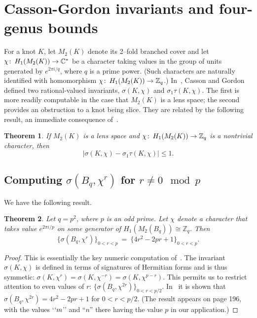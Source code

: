 \documentclass[10pt,oneside]{amsart}
\def\Z{{\mathbb Z}}
\def\C{{\mathbb C}}
\def\co{\colon\thinspace}
\newtheorem{theorem}{Theorem}
\theoremstyle{definition}
\begin{document}
\section{Casson-Gordon invariants and four-genus bounds}\label{sec-cg}
For a knot  $K$, let $M_2(K)$ denote its 2--fold branched cover and let $\chi\co H_1(M_2(K)) \to \C^*$ be a character  taking values in the group of units generated by $e^{2 \pi i/q}$, where $q$ is a prime power.  (Such characters are naturally identified with homomorphism $\chi\co H_1(M_2(K)) \to \Z_q$.)   In~\cite{MR900252}, Casson and Gordon defined two rational-valued  invariants, $\sigma(K,\chi)$ and $\sigma_1 \tau (K,\chi)$.  The first is more readily computable in the case that $M_2(K)$ is a lens space; the second    provides an obstruction to   a knot   being slice.  They are related by the following result, an immediate consequence of~\cite[Theorem 3]{MR900252}.

\begin{theorem}  If $M_2(K)$ is a lens space and $\chi \co H_1(M_2(K)) \to \Z_q$ is a nontrivial character, then   \[ \big|  \sigma(K, \chi)  - \sigma_1 \tau(K, \chi) \big| \le 1.\]
\end{theorem}

\subsection{Computing $\sigma (B_q, \chi^r) $ for $r \ne 0  \mod p$}

We have the following result.
 
\begin{theorem}\label{thm-nonzero}
Let  $q = p^2$, where  $p$ is an odd prime.  Let $\chi$ denote a  character  that takes value  $e^{2 \pi i /p}$ on some generator of $H_1(M_2(B_q)) \cong \Z_q$.   Then
\[ \{\sigma(B_q, \chi^r)\}_{0<r< p}\ =\  \{  4r^2 - 2pr +1 \}_{0<r< p}.\]
\end{theorem}
\begin{proof}  This is essentially the key  numeric computation of~\cite{MR900252}.   The invariant  $\sigma(K,\chi)$ is defined in terms of signatures of Hermitian forms and is thus symmetic:    $\sigma(K,\chi^r) =\sigma(K,\chi^{-r}) = \sigma(K,\chi^{p-r}). $  This permits us to restrict attention to  even values of $r$:  $ \{\sigma(B_q, \chi^{2r})\}_{0<r< p/2}$.
In~\cite{MR900252}  it is shown that $\sigma(B_q, \chi^{2r} ) = 4r^2 - 2pr +1$ for $0 < r < p/2$.  (The result appears on page 196, with the values  `$`m$'' and ``$n$'' there having the value  $p$ in our application.)
\end{proof}
\end{document}
